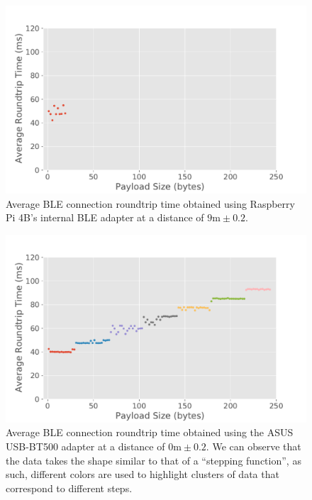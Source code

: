 \begin{figure}[H]
    \centering
    \includegraphics[width=0.75\linewidth]{images/ble-roundtrip-hci1-900cm.pdf}
    \caption[Average \acs{BLE} connection roundtrip time obtained using Raspberry Pi 4B's internal \acs{BLE} adapter at a distance of 9m.]{Average \acs{BLE} connection roundtrip time obtained using Raspberry Pi 4B's internal \acs{BLE} adapter at a distance of $9\text{m} \pm 0.2$.}
    \label{fig:ble-roundtrip-hci1-9m}
\end{figure}

\begin{figure}[H]
    \centering
    \includegraphics[width=0.75\linewidth]{images/ble-roundtrip-hci0-0cm.pdf}
    \caption[Average \acs{BLE} connection roundtrip time obtained using the ASUS USB-BT500 adapter at a distance of 0m.]{Average \acs{BLE} connection roundtrip time obtained using the ASUS USB-BT500 adapter at a distance of $0\text{m} \pm 0.2$. We can observe that the data takes the shape similar to that of a ``stepping function'', as such, different colors are used to highlight clusters of data that correspond to different steps.}
    \label{fig:ble-roundtrip-hci0-0m}
\end{figure}

